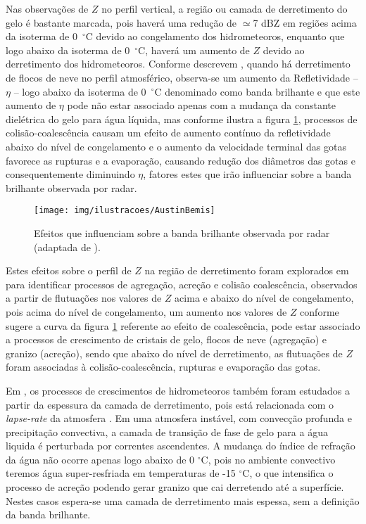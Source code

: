 Nas observações de $Z$ no perfil vertical, a região ou camada de derretimento do gelo é bastante marcada, pois haverá uma redução de $\simeq$7 dBZ em regiões acima da isoterma de {0~$^{\circ}$C} devido ao congelamento dos hidrometeoros, enquanto que logo abaixo da isoterma de 0~$^{\circ}$C, haverá um aumento de $Z$ devido ao derretimento dos hidrometeoros. Conforme descrevem , quando há derretimento de flocos de neve no perfil atmosférico, observa-se um aumento da Refletividade -- $\eta$ -- logo abaixo da isoterma de {0~$^{\circ}$C} denominado como banda brilhante e que este aumento de $\eta$ pode não estar associado apenas com a mudança da constante dielétrica do gelo para água líquida, mas conforme ilustra a figura \ref{Austin},  processos de colisão-coalescência causam um efeito de aumento contínuo da refletividade abaixo do nível de congelamento e o aumento da velocidade terminal das gotas favorece as rupturas e a evaporação, causando redução dos diâmetros das gotas e consequentemente diminuindo $\eta$,  fatores estes que irão influenciar sobre a banda brilhante observada por radar.

\begin{figure}[ht]
\centering
\texttt{[image: img/ilustracoes/AustinBemis]}
\caption{Efeitos que influenciam sobre a banda brilhante observada por radar (adaptada de ).}
\label{Austin}
\end{figure}

Estes efeitos sobre o perfil de $Z$ na região de derretimento  foram explorados em  para identificar processos de agregação, acreção e colisão coalescência, observados a partir de flutuações nos valores de $Z$ acima e abaixo do nível de congelamento, pois acima do nível de congelamento, um aumento nos valores de $Z$ conforme sugere a curva da figura \ref{Austin} referente ao efeito de coalescência, pode estar associado a processos de crescimento de cristais de gelo, flocos de neve (agregação) e granizo (acreção), sendo que abaixo do nível de derretimento, as flutuações de $Z$ foram associadas à colisão-coalescência, rupturas e evaporação das gotas. 

Em , os processos de crescimentos de hidrometeoros também foram estudados a partir da espessura da camada de derretimento, pois está relacionada com o \textit{lapse-rate} da atmosfera \cite[p.~462]{austin1950,mason1971_2ed}. Em uma atmosfera instável, com convecção profunda e precipitação convectiva, a camada de transição de fase de gelo para a água liquida é perturbada por correntes ascendentes. A mudança do índice de refração da água não ocorre apenas logo abaixo de 0 $^{\circ}$C, pois no ambiente convectivo teremos água super-resfriada em temperaturas de -15 $^{\circ}$C, o que intensifica o processo de acreção podendo gerar granizo que cai derretendo até a superfície. Nestes casos espera-se uma camada de derretimento mais espessa, sem a definição da banda brilhante. 

